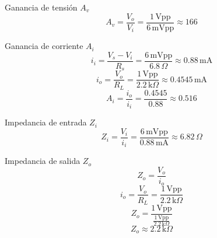 \begin{frame}{}

\begin{block}{Ganancia de tensión $A_v$}
\[
A_v = \frac{V_o}{V_i} = \frac{1\,\text{Vpp}}{6\,\text{mVpp}} \approx 166
\]
\end{block}

\begin{block}{Ganancia de corriente $A_i$}
\[
i_i = \frac{V_s - V_i}{R_s} = \frac{6\,\text{mVpp}}{6.8\,\Omega} \approx 0.88\,\text{mA}
\]
\[
i_o = \frac{V_o}{R_L} = \frac{1\,\text{Vpp}}{2.2\,\text{k}\Omega} \approx 0.4545\,\text{mA}
\]
\[
A_i = \frac{i_o}{i_i} = \frac{0.4545}{0.88} \approx 0.516
\]
\end{block}

\begin{block}{Impedancia de entrada $Z_i$}
\[
Z_i = \frac{V_i}{i_i} = \frac{6\,\text{mVpp}}{0.88\,\text{mA}} \approx 6.82\,\Omega
\]
\end{block}

\end{frame}



\begin{frame}{}

\begin{block}{Impedancia de salida $Z_o$}
\[
Z_o = \frac{V_o}{i_o}
\]
\[
i_o = \frac{V_o}{R_L} = \frac{1\,\text{Vpp}}{2.2\,\text{k}\Omega}
\]
\[
Z_o = \frac{1\,\text{Vpp}}{\tfrac{1\,\text{Vpp}}{2.2\,\text{k}\Omega}}
\]
\[
Z_o \approx 2.2\,\text{k}\Omega
\]
\end{block}

\end{frame}
